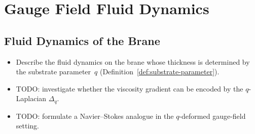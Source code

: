 \chapter{Gauge Field Fluid Dynamics}
\label{chap:gauge-fluid}


\section{Fluid Dynamics of the Brane}
\label{sec:brane-fluid}

\begin{itemize}
  \item Describe the fluid dynamics on the brane whose thickness is
        determined by the substrate parameter~$q$
        (Definition~\ref{def:substrate-parameter}).
  \item TODO: investigate whether the viscosity gradient can be encoded
        by the $q$-Laplacian $\Delta_q$.
  \item TODO: formulate a Navier--Stokes analogue in the $q$-deformed
        gauge-field setting.
\end{itemize}


